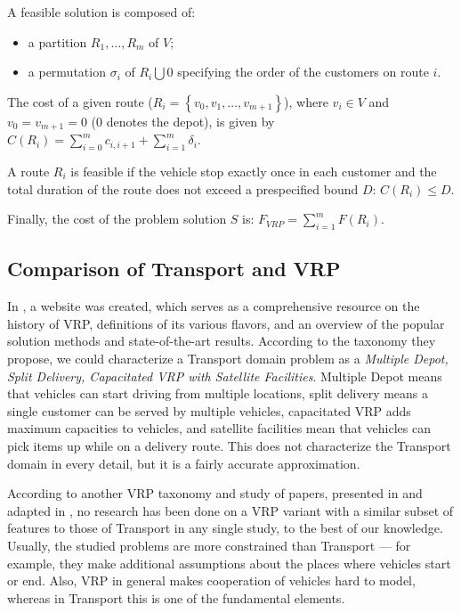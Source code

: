 {A feasible solution is composed of:

\begin{itemize}
\item a partition ${R_{1}, \ldots, R_{m}}$ of ${V}$;
\item a permutation ${\sigma_{i}}$ of ${R_{i} \bigcup {0}}$ specifying the order of the customers on route ${i}$.
\end{itemize}


The cost of a given route (${R_{i} = \left\lbrace v_{0}, v_{1}, \ldots, v_{m+1} \right\rbrace}$), where ${v_{i} \in V}$ and ${v_{0} = v_{m+1} = 0}$ (0 denotes the depot), is given by ${C(R_{i}) = \sum_{i=0}^{m} c_{i,i+1} + \sum_{i=1}^{m} \delta_{i}}$.

A route ${R_{i}}$ is feasible if the vehicle stop exactly once in each customer and the total duration of the route does not exceed a prespecified bound ${D}$: ${C(R_{i}) \leq D}$.

Finally, the cost of the problem solution ${S}$ is: ${F_{VRP} = \sum_{i=1}^{m} F(R_{i})}$.
}

\subsection{Comparison of Transport and VRP}

In \citet{ResearchGroup2013}, a website was created, which serves as a comprehensive resource on the history of VRP,
definitions of its various flavors, and an overview of the popular solution methods and state-of-the-art results. According to the taxonomy they propose, we could characterize a Transport domain problem
as a \textit{Multiple Depot, Split Delivery, Capacitated VRP with Satellite Facilities}. Multiple Depot
means that vehicles can start driving from multiple locations, split delivery
means a single customer can be served by multiple vehicles, capacitated VRP adds maximum
capacities to vehicles, and satellite facilities mean that vehicles can pick items up
while on a delivery route. This does not characterize the Transport domain in every detail, but it is a fairly accurate approximation.

According to another VRP taxonomy and study of papers, presented in \citet{Eksioglu2009} and adapted in \citet{Braekers2016}, no research has been done on a VRP variant with a similar subset of features to those of Transport in any single study, to the best of our knowledge.
Usually, the studied problems are more constrained than Transport --- for example, they make additional assumptions about the places where vehicles start or end. Also, VRP in general
makes cooperation of vehicles hard to model, whereas in Transport this is one of the fundamental elements.

